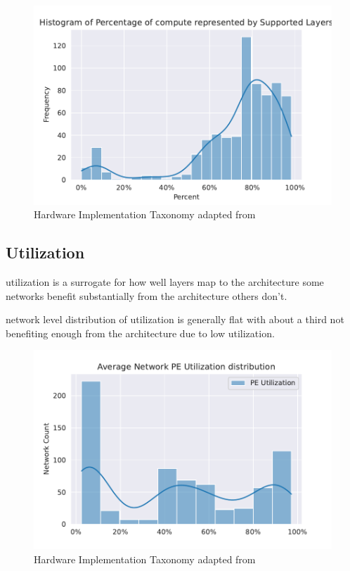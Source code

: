 \begin{figure}[ht]
    \centering
    \includegraphics[scale=0.58]{Plots/overview/percent.pdf}
    \caption{Hardware Implementation Taxonomy adapted from \cite{maestro}}
    \label{fig:hw_taxonomy}
\end{figure}

\subsection{Utilization}
\label{chap:hero:sim_platform:cigar_side}

utilization is a surrogate for how well layers map to the architecture
some networks benefit substantially from the architecture
others don't. 

network level distribution of utilization is generally flat with
about a third not benefiting enough from the architecture due to low
utilization. 


\begin{figure}[ht]
    \centering
    \includegraphics[scale=0.58]{Plots/utilization/network.pdf}
    \caption{Hardware Implementation Taxonomy adapted from \cite{maestro}}
    \label{fig:hw_taxonomy}
\end{figure}


